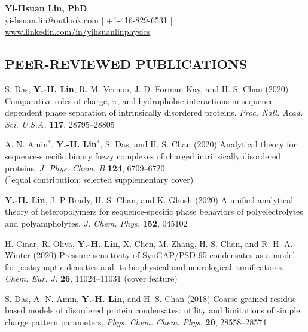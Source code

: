 \documentclass[11pt,letterpaper, sans]{article}
\makeatletter
\newcommand{\tname}[1]{{\bf #1}}%
\newcommand{\newsec}[1]{\subsection*{\hspace{-1.5pt}\uppercase{#1}}}
\def\name{Yi-Hsuan Lin, PhD}
\def\header{
\begin{center}
{\LARGE\bf \name} \vspace{0.3cm} \\
yi-hsuan.lin@outlook.com
| $+$1-416-829-6531 | 
\href{https://www.linkedin.com/in/yihsuanlinphysics/}{www.linkedin.com/in/yihsuanlinphysics}
\end{center}

}
\makeatother
\begin{document}
\header




\begin{flushleft}

\newsec{Peer-Reviewed Publications}

\begin{etaremune}[leftmargin=17pt]

\item S. Das, \tname{Y.-H. Lin}, R. M. Vernon, J. D. Forman-Kay, and H. S, Chan (2020)
Comparative roles of charge, $\pi$, and hydrophobic interactions in sequence-dependent phase separation of intrinsically disordered proteins. 
{\it Proc. Natl. Acad. Sci. U.S.A.} {\bf 117}, 28795--28805

\item 
A. N. Amin$^*$, \tname{Y.-H. Lin}$^*$, S. Das, and H. S. Chan (2020)
Analytical theory for sequence-specific binary fuzzy complexes of charged intrinsically disordered proteins.
{\it J. Phys. Chem. B} {\bf 124}, 6709--6720 \\
($^*$equal contribution; selected supplementary cover) 

\item
\tname{Y.-H. Lin}, J. P Brady, H. S. Chan, and K. Ghosh (2020)
A unified analytical theory of heteropolymers for sequence-specific phase behaviors of polyelectrolytes and polyampholytes. 
{\it J. Chem. Phys.} {\bf 152}, 045102

\item
H. Cinar, R. Oliva, \tname{Y.-H. Lin}, X. Chen, M. Zhang, H. S. Chan, and R. H. A. Winter (2020)
Pressure sensitivity of SynGAP/PSD-95 condensates as a model for postsynaptic densities and its biophysical and neurological ramifications. 
{\it Chem. Eur. J.} {\bf 26}, 11024--11031 (cover feature)

\item
S. Das, A. N. Amin, \tname{Y.-H. Lin}, and H. S. Chan (2018)
Coarse-grained residue-based models of disordered protein condensates: utility and limitations of simple charge pattern parameters, {\it Phys. Chem. Chem. Phys.} {\bf 20}, 28558--28574


\end{etaremune}
\end{flushleft}
\end{document}
